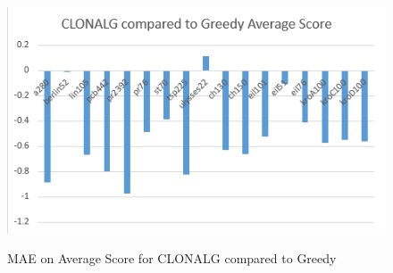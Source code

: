 \begin{figure}[H]
	\includegraphics[]{Images/CLONALG_Fig_Avg.png}
	\label{CLONALG_Avg}
	\caption{MAE on Average Score for CLONALG compared to Greedy}
\end{figure}

